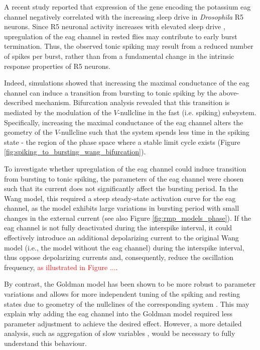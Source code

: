 \documentclass[../main.tex]{subfiles}
\begin{document}
A recent study reported that expression of the gene encoding the potassium \gls{eag} channel negatively correlated with the increasing sleep drive \parencite{doppSinglecellTranscriptomicsReveals2024} in \textit{Drosophila} R5 neurons. Since R5 neuronal activity increases with elevated sleep drive \parencite{liuSleepDriveEncoded2016}, upregulation of the \gls{eag} channel in rested flies may contribute to early burst termination. Thus, the observed tonic spiking may result from a reduced number of spikes per burst, rather than from a fundamental change in the intrinsic response properties of R5 neurons.

Indeed, simulations showed that increasing the maximal conductance of the \gls{eag} channel can induce a transition from bursting to tonic spiking by the above-described mechanism. Bifurcation analysis revealed that this transition is mediated by the modulation of the $V$-nullcline in the fast (i.e. spiking) subsystem. Specifically, increasing the maximal conductance of the \gls{eag} channel alters the geometry of the $V$-nullcline such that the system spends less time in the spiking state - the region of the phase space where a stable limit cycle exists (Figure \ref{fig:spiking_to_bursting_wang_bifurcation}).

To investigate whether upregulation of the \gls{eag} channel could induce transition from bursting to tonic spiking, the parameters of the \gls{eag} channel were chosen such that its current does not significantly affect the bursting period. In the Wang model, this required a steep steady-state activation curve for the \gls{eag} channel, as the model exhibits large variations in bursting period with small changes in the external current (see also Figure \ref{fig:rmp_models_phase}). If the \gls{eag} channel is not fully deactivated during the interspike interval, it could effectively introduce an additional depolarizing current to the original Wang model (i.e., the model without the \gls{eag} channel) during the interspike interval, thus oppose depolarizing currents and, consequently, reduce the oscillation frequency, \textcolor{red}{as illustrated in Figure ...}.

\color{red}
By contrast, the Goldman model has been shown to be more robust to parameter variations and allows for more independent tuning of the spiking and resting states due to geometry of the nullclines of the corresponding system \parencite{franciRobustTunableBursting2018}.
This may explain why adding the \gls{eag} channel into the Goldman model required less parameter adjustment to achieve the desired effect. However, a more detailed analysis, such as aggregation of slow variables \parencite{franciModelingModulationNeuronal2014}, would be necessary to fully understand this behaviour.
\color{black}
\end{document}
